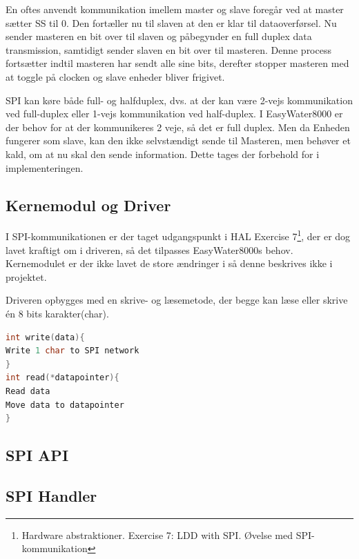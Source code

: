 En oftes anvendt kommunikation imellem master og slave foregår ved at master sætter SS til 0. Den fortæller nu til slaven at den er klar til 
dataoverførsel. Nu sender masteren en bit over til slaven og påbegynder en full duplex data transmission, samtidigt sender slaven en bit over
til masteren. Denne process fortsætter indtil masteren har sendt alle sine bits, derefter stopper masteren med at toggle på clocken og slave 
enheder bliver frigivet.

SPI kan køre både full- og halfduplex, dvs. at der kan være 2-vejs kommunikation ved full-duplex eller 1-vejs kommunikation ved half-duplex. I EasyWater8000 er der behov for at der kommunikeres 2 veje, så det er full duplex. Men da Enheden fungerer som slave, kan den ikke selvstændigt sende til Masteren, men behøver et kald, om at nu skal den sende information. Dette tages der forbehold for i implementeringen.

\subsection{Kernemodul og Driver}

I SPI-kommunikationen er der taget udgangspunkt i HAL Exercise 7\footnote{Hardware abstraktioner. Exercise 7: LDD with SPI. Øvelse med SPI-kommunikation}, der er dog lavet kraftigt om i driveren, så det tilpasses EasyWater8000s behov. Kernemodulet er der ikke lavet de store ændringer i så denne beskrives ikke i projektet.

Driveren opbygges med en skrive- og læsemetode, der begge kan læse eller skrive én 8 bits karakter(char).

\begin{lstlisting}[language=C]
int write(data){
Write 1 char to SPI network
}
int read(*datapointer){
Read data
Move data to datapointer
}
\end{lstlisting}


\subsection{SPI API}




\subsection{SPI Handler}
